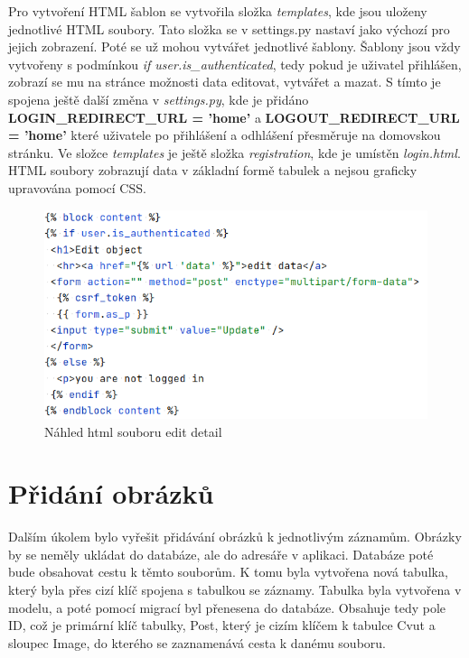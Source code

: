 Pro vytvoření HTML šablon se vytvořila složka \emph{templates}, kde
jsou uloženy jednotlivé HTML soubory. Tato složka se v settings.py
nastaví jako výchozí pro jejich zobrazení. Poté se už mohou vytvářet
jednotlivé šablony. Šablony jsou vždy vytvořeny s podmínkou \emph{if
  user.is\_authenticated}, tedy pokud je uživatel přihlášen, zobrazí
se mu na stránce možnosti data editovat, vytvářet a mazat. S tímto je
spojena ještě další změna v \emph{settings.py}, kde je přidáno
\textbf{LOGIN\_REDIRECT\_URL = 'home'} a \textbf{LOGOUT\_REDIRECT\_URL
  = 'home'} které uživatele po přihlášení a odhlášení přesměruje na
domovskou stránku. Ve složce \emph{templates} je ještě složka
\emph{registration}, kde je umístěn \emph{login.html}. HTML soubory
zobrazují data v základní formě tabulek a nejsou graficky upravována
pomocí CSS.

\begin{figure}[H] \centering
    \includegraphics[width=350pt]{./pictures/8-edit-detail-html.PNG}
    \caption[Náhled html souboru edit detail]{Náhled html souboru edit detail}
	\label{fig:Náhled HTML souboru edit detail}
\end{figure}


\newpage

\section{Přidání obrázků}

Dalším úkolem bylo vyřešit přidávání obrázků k jednotlivým
záznamům. Obrázky by se neměly ukládat do databáze, ale do adresáře v
aplikaci. Databáze poté bude obsahovat cestu k těmto souborům. K tomu
byla vytvořena nová tabulka, který byla přes cizí klíč spojena s
tabulkou se záznamy. Tabulka byla vytvořena v modelu, a poté pomocí
migrací byl přenesena do databáze. Obsahuje tedy pole ID, což je
primární klíč tabulky, Post, který je cizím klíčem k tabulce Cvut a
sloupec Image, do kterého se zaznamenává cesta k danému souboru.

